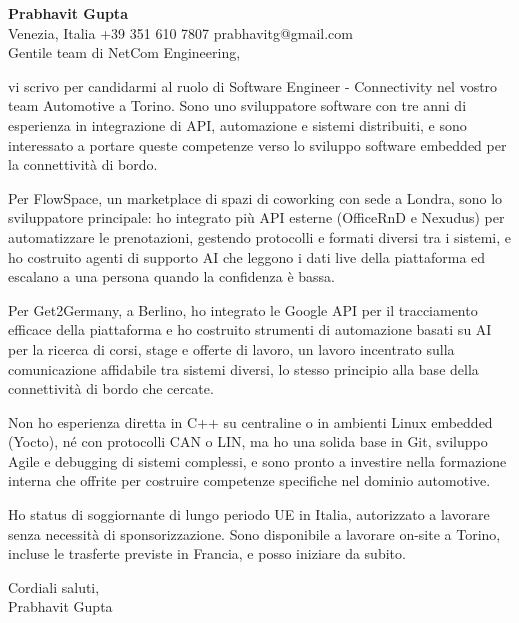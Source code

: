 \documentclass[a4paper,10.5pt]{article}
\begin{document}
\textbf{Prabhavit Gupta}\\
Venezia, Italia \textbar{} +39 351 610 7807 \textbar{} prabhavitg@gmail.com\\[10pt]
Gentile team di NetCom Engineering,

vi scrivo per candidarmi al ruolo di Software Engineer - Connectivity nel vostro team Automotive a Torino. Sono uno sviluppatore software con tre anni di esperienza in integrazione di API, automazione e sistemi distribuiti, e sono interessato a portare queste competenze verso lo sviluppo software embedded per la connettività di bordo.

Per FlowSpace, un marketplace di spazi di coworking con sede a Londra, sono lo sviluppatore principale: ho integrato più API esterne (OfficeRnD e Nexudus) per automatizzare le prenotazioni, gestendo protocolli e formati diversi tra i sistemi, e ho costruito agenti di supporto AI che leggono i dati live della piattaforma ed escalano a una persona quando la confidenza è bassa.

Per Get2Germany, a Berlino, ho integrato le Google API per il tracciamento efficace della piattaforma e ho costruito strumenti di automazione basati su AI per la ricerca di corsi, stage e offerte di lavoro, un lavoro incentrato sulla comunicazione affidabile tra sistemi diversi, lo stesso principio alla base della connettività di bordo che cercate.

Non ho esperienza diretta in C++ su centraline o in ambienti Linux embedded (Yocto), né con protocolli CAN o LIN, ma ho una solida base in Git, sviluppo Agile e debugging di sistemi complessi, e sono pronto a investire nella formazione interna che offrite per costruire competenze specifiche nel dominio automotive.

Ho status di soggiornante di lungo periodo UE in Italia, autorizzato a lavorare senza necessità di sponsorizzazione. Sono disponibile a lavorare on-site a Torino, incluse le trasferte previste in Francia, e posso iniziare da subito.

Cordiali saluti,\\
Prabhavit Gupta
\end{document}
